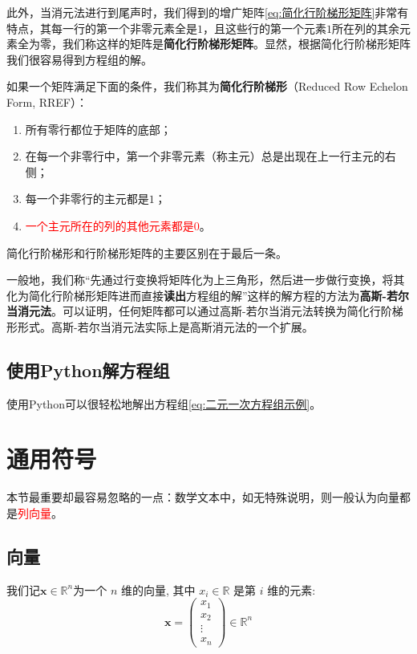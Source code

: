 \documentclass[lang=cn,newtx,10pt,scheme=chinese]{elegantbook}
\begin{document}
此外，当消元法进行到尾声时，我们得到的增广矩阵\ref{eq:简化行阶梯形矩阵}非常有特点，其每一行的第一个非零元素全是$1$，且这些行的第一个元素$1$所在列的其余元素全为零，我们称这样的矩阵是\textcolor{third}{\bf 简化行阶梯形矩阵}。显然，根据简化行阶梯形矩阵我们很容易得到方程组的解。

\begin{definition}[简化行阶梯形]
    如果一个矩阵满足下面的条件，我们称其为{\bf 简化行阶梯形}（Reduced Row Echelon Form, RREF）：
\begin{enumerate}
    \item 所有零行都位于矩阵的底部；
    \item 在每一个非零行中，第一个非零元素（称主元）总是出现在上一行主元的右侧；
    \item 每一个非零行的主元都是$1$；
    \item \textcolor{red}{一个主元所在的列的其他元素都是$0$}。
\end{enumerate}

简化行阶梯形和行阶梯形矩阵的主要区别在于最后一条。

\end{definition}

一般地，我们称\textcolor{second}{“先通过行变换将矩阵化为上三角形，然后进一步做行变换，将其化为简化行阶梯形矩阵进而直接\textbf{读出}方程组的解”}这样的解方程的方法为\textcolor{third}{\bf 高斯-若尔当消元法}。可以证明，任何矩阵都可以通过高斯-若尔当消元法转换为简化行阶梯形形式。高斯-若尔当消元法实际上是高斯消元法的一个扩展。

\subsection{使用Python解方程组}
\label{subsec:使用Python解方程组}

使用Python可以很轻松地解出方程组\ref{eq:二元一次方程组示例}。



\section{通用符号}

\begin{note}
    本节最重要却最容易忽略的一点：数学文本中，如无特殊说明，则一般认为向量都是\textcolor{red}{列向量}。
\end{note}

\subsection{向量}
我们记$\boldsymbol{x}\in \mathbb{R}^n$为一个 $n$ 维的向量, 其中 $x_i \in \mathbb{R}$ 是第 $i$ 维的元素:
$$
\boldsymbol{x}=\left(\begin{array}{c}
x_1 \\
x_2 \\
\vdots \\
x_n
\end{array}\right) \in \mathbb{R}^n
$$
\end{document}
